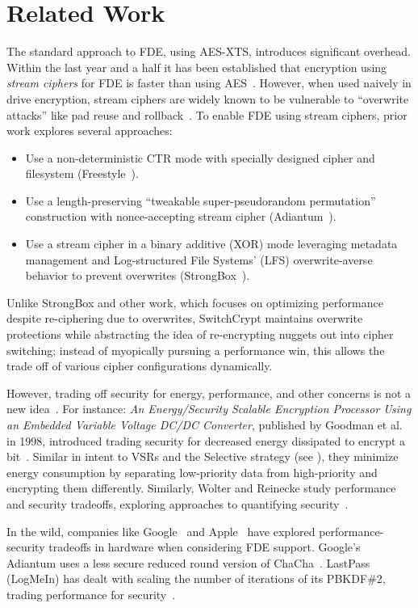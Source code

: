 \section{Related Work}\label{sec:related}

The standard approach to FDE, using AES-XTS, introduces significant overhead.
Within the last year and a half it has been established that encryption using
\emph{stream ciphers} for FDE is faster than using AES~\cite{StrongBox,
AnotherPaper1, AnotherPaper2}. However, when used naively in drive encryption,
stream ciphers are widely known to be vulnerable to ``overwrite attacks'' like
pad reuse and rollback~\cite{KatzLindell, StrongBox}. To enable FDE using stream
ciphers, prior work explores several approaches:

\begin{itemize}
   \item Use a non-deterministic CTR mode with specially designed cipher and
   filesystem (Freestyle~\cite{Freestyle}).
   \item Use a length-preserving ``tweakable super-pseudorandom permutation''
   construction with nonce-accepting stream cipher (Adiantum~\cite{Adiantum}).
   \item Use a stream cipher in a binary additive (XOR) mode leveraging metadata
   management and Log-structured File Systems' (LFS) overwrite-averse behavior
   to prevent overwrites (StrongBox~\cite{StrongBox}).
\end{itemize}

Unlike StrongBox and other work, which focuses on optimizing performance despite
re-ciphering due to overwrites, SwitchCrypt maintains overwrite protections
while abstracting the idea of re-encrypting nuggets out into cipher switching;
instead of myopically pursuing a performance win, this allows the trade off of
various cipher configurations dynamically.

However, trading off security for energy, performance, and other concerns is not
a new idea~\cite{ScalableSecurity, WolterReinecke, ZengChow1, ZengChow2,
HaleemEtAl, LiOmiecinski}. For instance: \textit{An Energy/Security Scalable
Encryption Processor Using an Embedded Variable Voltage DC/DC Converter},
published by Goodman et al. in 1998, introduced trading security for decreased
energy dissipated to encrypt a bit~\cite{ScalableSecurity}. Similar in intent to
VSRs and the Selective strategy (see ), they minimize energy
consumption by separating low-priority data from high-priority and encrypting
them differently. Similarly, Wolter and Reinecke study performance and security
tradeoffs, exploring approaches to quantifying security~\cite{WolterReinecke}.

In the wild, companies like Google~\cite{AndroidM} and Apple~\cite{iOSFDE} have
explored performance-security tradeoffs in hardware when considering FDE
support. Google's Adiantum uses a less secure reduced round version of
ChaCha~\cite{Adiantum}. LastPass (LogMeIn) has dealt with scaling the number of
iterations of its PBKDF\#2, trading performance for security~\cite{LastPass}.
